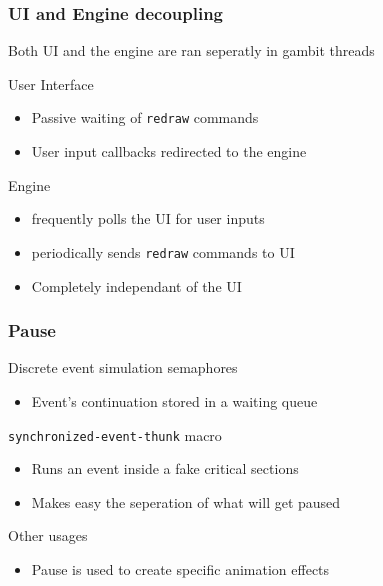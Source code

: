 \documentclass{beamer}
\newcommand{\<}[1]{\`#1}
\begin{document}
\begin{frame}
  \frametitle{UI and Engine decoupling}

  Both UI and the engine are ran seperatly in gambit threads
  \begin{block}{User Interface}
    \begin{itemize}
    \item Passive waiting of \texttt{redraw} commands
    \item User input callbacks redirected to the engine
    \end{itemize}
  \end{block}

  \begin{block}{Engine}
    \begin{itemize}
    \item frequently polls the UI for user inputs
    \item periodically sends \texttt{redraw} commands to UI
    \item Completely independant of the UI
    \end{itemize}
  \end{block}
\end{frame}

\begin{frame}
  \frametitle{Pause}

  \begin{block}{Discrete event simulation semaphores }
    \begin{itemize}
      \item Event's continuation stored in a waiting queue
    \end{itemize}
  \end{block}

  \begin{block}{\texttt{synchronized-event-thunk} macro}
    \begin{itemize}
      \item Runs an event inside a fake critical sections
      \item Makes easy the seperation of what will get paused
    \end{itemize}
  \end{block}

  \begin{block}{Other usages}
    \begin{itemize}
      \item Pause is used to create specific animation effects
    \end{itemize}
  \end{block}
\end{frame}
\end{document}
